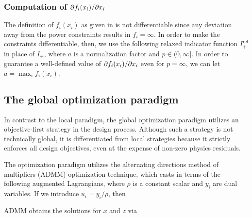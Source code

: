 \documentclass{book}
\begin{document}
\subsubsection{Computation of $\partial f_i(x_i) / \partial x_i$}
The definition of $f_i(x_i)$ as given in  is not differentiable 
    since any deviation away from the power constraints results in $f_i = \infty$.
In order to make the constraints differentiable, then, 
    we use the following relaxed indicator function $I^\text{rel}_+$ in place of $I_+$,
    where $a$ is a normalization factor and $p \in (0, \infty]$. 
In order to guarantee a well-defined value of $\partial f_i(x_i) / \partial x_i$ even for $p = \infty$,
    we can let $a = \max_i f_i(x_i)$.



\subsection{The global optimization paradigm}
In contrast to the local paradigm, 
    the global optimization paradigm utilizes an objective-first strategy
    in the design process.
Although such a strategy is not technically global,
    it is differentiated from local strategies because
    it strictly enforces all design objectives,
    even at the expense of non-zero physics residuals.

The optimization paradigm utilizes 
    the alternating directions method of multipliers\cite{ADMM} (ADMM) optimization technique, 
    which casts  in terms of the following augmented Lagrangians, 
    where $\rho$ is a constant scalar and 
    $y_i$ are dual variables. If we introduce $u_i = y_i / \rho$, then 

ADMM obtains the solutions for $x$ and $z$ via
\end{document}
